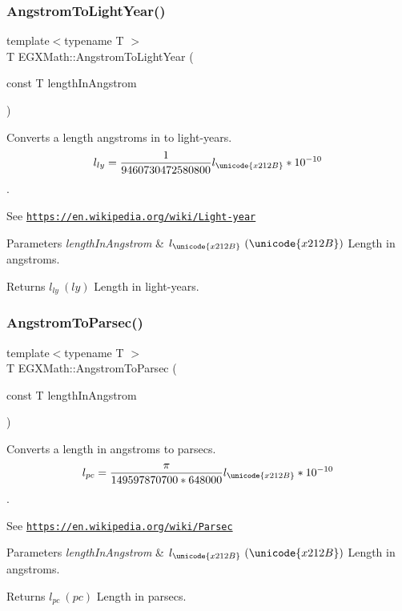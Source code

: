 \subsubsection{\texorpdfstring{Angstrom\+To\+Light\+Year()}{AngstromToLightYear()}}
{\footnotesize\ttfamily template$<$typename T $>$ \\
T E\+G\+X\+Math\+::\+Angstrom\+To\+Light\+Year (\begin{DoxyParamCaption}\item[{const T}]{length\+In\+Angstrom }\end{DoxyParamCaption})}



Converts a length angstroms in to light-\/years. \[ l_{ly}= \frac{1}{9460730472580800} l_{\unicode{x212B}} * 10^{-10} \]. 

See \href{https://en.wikipedia.org/wiki/Light-year}{\tt https\+://en.\+wikipedia.\+org/wiki/\+Light-\/year} 
\begin{DoxyParams}{Parameters}
{\em length\+In\+Angstrom} & $ l_{\unicode{x212B}}\ (\unicode{x212B})$ Length in angstroms. \\
\hline
\end{DoxyParams}
\begin{DoxyReturn}{Returns}
$ l_{ly}\ (ly)$ Length in light-\/years. 
\end{DoxyReturn}
\mbox{\label{group___e_g_x_math-_conversions-_length_conversions-_non-_s_i-_angstrom-_astronomical_ga590d77221fd449be2e65f24f8d14a6d5}} 
\subsubsection{\texorpdfstring{Angstrom\+To\+Parsec()}{AngstromToParsec()}}
{\footnotesize\ttfamily template$<$typename T $>$ \\
T E\+G\+X\+Math\+::\+Angstrom\+To\+Parsec (\begin{DoxyParamCaption}\item[{const T}]{length\+In\+Angstrom }\end{DoxyParamCaption})}



Converts a length in angstroms to parsecs. \[ l_{pc}=\frac{\pi}{149597870700 * 648000} l_{\unicode{x212B}} * 10^{-10} \]. 

See \href{https://en.wikipedia.org/wiki/Parsec}{\tt https\+://en.\+wikipedia.\+org/wiki/\+Parsec} 
\begin{DoxyParams}{Parameters}
{\em length\+In\+Angstrom} & $ l_{\unicode{x212B}}\ (\unicode{x212B})$ Length in angstroms. \\
\hline
\end{DoxyParams}
\begin{DoxyReturn}{Returns}
$ l_{pc}\ (pc)$ Length in parsecs. 
\end{DoxyReturn}
